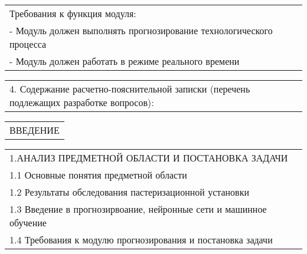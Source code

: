 \documentclass[12pt, А4, twoside]{article} %
\begin{document}
\begin{FlushLeft}
    \begin{tabular}{p{17.25cm}} 
        \hspace{0.3cm} \textsf{Требования к функция модуля:} \vspace{1pt} \hline \\
        \hspace{0.6cm} \textsf{- Модуль должен выполнять прогнозирование технологического процесса}\vspace{1pt} \hline \\
        \hspace{0.6cm} \textsf{- Модуль должен работать в режиме реального времени}\vspace{1pt} \hline 
    \end{tabular}   

    \begin{tabular}{p{17.25cm}}
        \textsf{4. Содержание расчетно-пояснительной записки (перечень подлежащих разработке вопросов):} \vspace{1pt} \hline \\
    \end{tabular} 
    
    \begin{tabular}{p{17.25cm}} 
        \hspace{0.3cm} \textsf{ВВЕДЕНИЕ} \vspace{1pt} \hline \\
    \end{tabular} 

    \begin{tabular}{p{17.25cm}}
        \hspace{0.3cm} \textsf{1.АНАЛИЗ ПРЕДМЕТНОЙ ОБЛАСТИ И ПОСТАНОВКА ЗАДАЧИ} \vspace{1pt} \hline \\
        \hspace{0.6cm} \textsf{1.1 Основные понятия предметной области} \vspace{1pt} \hline \\
        \hspace{0.6cm} \textsf{1.2 Результаты обследования пастеризационной установки} \vspace{1pt} \hline \\
        \hspace{0.6cm} \textsf{1.3 Введение в прогнозирвоание, нейронные сети и машинное обучение} \vspace{1pt} \hline \\
        \hspace{0.6cm} \textsf{1.4 Требования к модулю прогнозирования и постановка задачи} \vspace{1pt} \hline \\
    \end{tabular}  


\end{FlushLeft}
\end{document}
